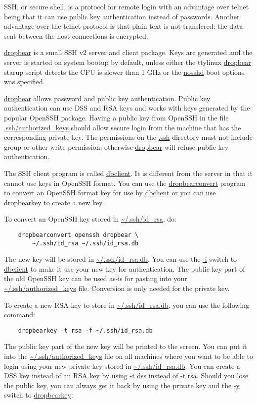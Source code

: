 \documentclass[10pt]{article}
\begin{document}
SSH, or secure shell, is a protocol for remote login with an advantage over
telnet being that it can use public key authentication instead of passwords.
Another advantage over the telnet protocol is that plain text is not
transfered; the data sent between the host connections is encrypted.

\url{dropbear} is a small SSH v2 server and client package. Keys are generated
and the server is started on system bootup by default, unless either the
ttylinux \url{dropbear} starup script detects the CPU is slower than 1 GHz or
the \url{nosshd} boot options was specified.

\url{dropbear} allows password and public key authentication. Public key
authentication can use DSS and RSA keys and works with keys generated by the
popular OpenSSH package. Having a public key from OpenSSH in the file
\url{.ssh/authorized_keys} should allow secure login from the machine that has
the corresponding private key. The permissions on the \url{.ssh} directory must
not include group or other write permission, otherwise \url{dropbear} will
refuse public key authentication.

The SSH client program is called \url{dbclient}. It is different from the
server in that it cannot use keys in OpenSSH format. You can use the
\url{dropbearconvert} program to convert an OpenSSH format key for use by
\url{dbclient} or you can use \url{dropbearkey} to create a new key.

To convert an OpenSSH key stored in \url{~/.ssh/id_rsa}, do:

\begin{lstlisting}
	dropbearconvert openssh dropbear \
		~/.ssh/id_rsa ~/.ssh/id_rsa.db
\end{lstlisting}

The new key will be stored in \url{~/.ssh/id_rsa.db}. You can use the \url{-i}
switch to \url{dbclient} to make it use your new key for authentication. The
public key part of the old OpenSSH key can be used as-is for pasting into your
\url{~/.ssh/authorized_keys} file. Conversion is only needed for the private
key.

To create a new RSA key to store in \url{~/.ssh/id_rsa.db}, you can use the
following command:

\begin{lstlisting}
	dropbearkey -t rsa -f ~/.ssh/id_rsa.db
\end{lstlisting}

The public key part of the new key will be printed to the screen. You can put
it into the \url{~/.ssh/authorized_keys} file on all machines where you want to
be able to login using your new private key stored in \url{~/.ssh/id_rsa.db}.
You can create a DSS key instead of an RSA key by using \url{-t} \url{dss}
instead of \url{-t} \url{rsa}. Should you lose the public key, you can always
get it back by using the private key and the \url{-y} switch to
\url{dropbearkey}:
\end{document}
